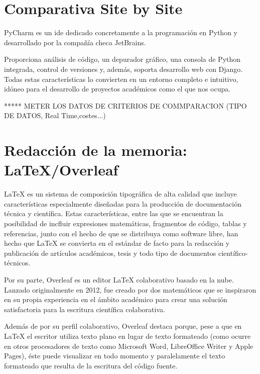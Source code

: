 \documentclass[a4paper, 12pt]{book}
\begin{document}
    
\section{Comparativa Site by Site}
\label{sec:comparativa}


PyCharm es un \gls{ide} dedicado concretamente a la programación en Python y desarrollado por la compañía checa JetBrains.

Proporciona análisis de código, un depurador gráfico, una consola de Python integrada, control de versiones y, además, soporta desarrollo web con Django. Todas estas características lo convierten en un entorno completo e intuitivo, idóneo para el desarrollo de proyectos académicos como el que nos ocupa.

***** METER LOS DATOS DE CRITERIOS DE COMMPARACION (TIPO DE DATOS, Real Time,costes...)



\section{Redacción de la memoria: LaTeX/Overleaf}
\label{sec:redaccion_de_la_memoria}

LaTeX es un sistema de composición tipográfica de alta calidad que incluye características especialmente diseñadas para la producción de documentación técnica y científica. Estas características, entre las que se encuentran la posibilidad de incfluir expresiones matemáticas, fragmentos de código, tablas y referencias, junto con el hecho de que se distribuya como software libre, han hecho que LaTeX se convierta en el estándar de facto para la redacción y publicación de artículos académicos, tesis y todo tipo de documentos científico-técnicos. 

Por su parte, Overleaf es un editor LaTeX colaborativo basado en la nube. Lanzado originalmente en 2012, fue creado por dos matemáticos que se inspiraron en su propia experiencia en el ámbito académico para crear una solución satisfactoria para la escritura científica colaborativa.

Además de por su perfil colaborativo, Overleaf destaca porque, pese a que en LaTeX el escritor utiliza texto plano en lugar de texto formateado (como ocurre en otros procesadores de texto como Microsoft Word, LibreOffice Writer y Apple Pages), éste puede visualizar en todo momento y paralelamente el texto formateado que resulta de la escritura del código fuente.
\end{document}
